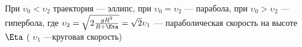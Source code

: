 При $\upsilon_0<\upsilon_2$ траектория --- эллипс, при $\upsilon_0=\upsilon_2$ --- парабола, при $\upsilon_0>\upsilon_2$ --- гипербола,
где $\upsilon_2=\sqrt{2\tfrac{gR^2}{R+\Eta}}=\sqrt{2}\upsilon_1$ --- параболическая скорость на высоте $\Eta$ ( $\upsilon_1$ ---круговая
скорость)

